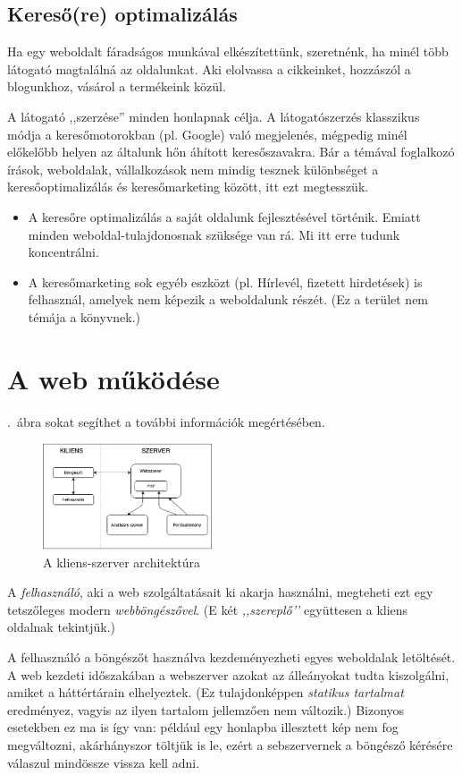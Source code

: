 \documentclass{thesis-ekf}
\theoremstyle{definition}
\begin{document}
	\subsection{Kereső(re) optimalizálás}
	Ha egy weboldalt fáradságos munkával elkészítettünk, szeretnénk, ha minél több látogató magtalálná az oldalunkat. Aki elolvassa a cikkeinket, hozzászól a blogunkhoz, vásárol a termékeink közül.
	
	A látogató ,,szerzése'' minden honlapnak célja. A látogatószerzés klasszikus módja a keresőmotorokban (pl. Google) való megjelenés, mégpedig minél előkelőbb helyen az általunk hőn áhított keresőszavakra. Bár a témával foglalkozó írások, weboldalak, vállalkozások nem mindig tesznek különbséget a keresőoptimalizálás és keresőmarketing között, itt ezt megtesszük.
	\begin{itemize}
		\item A keresőre optimalizálás a saját oldalunk fejlesztésével történik. Emiatt minden weboldal-tulajdonosnak szüksége van rá. Mi itt erre tudunk koncentrálni.
		\item A keresőmarketing sok egyéb eszközt (pl. Hírlevél, fizetett hirdetések) is felhasznál, amelyek nem képezik a weboldalunk részét. (Ez a terület nem témája a könyvnek.)
	\end{itemize}
\section{A web működése}
\Az{\ref{fig:kliensszerver}}.~ábra sokat segíthet a további információk megértésében.
\begin{figure}[th!]
	\centering
	\includegraphics[width=5cm]{kliensszerver}
	\caption{A kliens-szerver architektúra}
	\label{fig:kliensszerver}
\end{figure}

A  \emph{felhasználó}, aki a web szolgáltatásait ki akarja használni, megteheti ezt egy tetszőleges modern \emph{webböngészővel}. (E két  \emph{,,szereplő’'} együttesen a kliens oldalnak tekintjük.)

A felhasználó a böngészőt használva kezdeményezheti egyes weboldalak letöltését. A web kezdeti időszakában a webszerver azokat az álleányokat tudta kiszolgálni, amiket a háttértárain elhelyeztek. (Ez tulajdonképpen \emph{statikus tartalmat} eredményez, vagyis az ilyen tartalom jellemzően nem változik.) Bizonyos esetekben ez ma is így van: például egy honlapba illesztett kép nem fog megváltozni, akárhányszor töltjük is le, ezért a sebszervernek a böngésző kérésére válaszul mindössze vissza kell adni.
\end{document}

